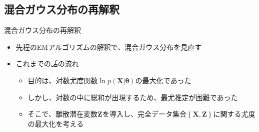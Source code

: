 \documentclass[dvipdfmx,notheorems,t]{beamer}
\begin{document}
\subsection{混合ガウス分布の再解釈}

\begin{frame}{混合ガウス分布の再解釈}

\begin{itemize}
	\item 先程のEMアルゴリズムの解釈で、混合ガウス分布を見直す
	\newline
	
	\item これまでの話の流れ
	\begin{itemize}
		\item 目的は、対数尤度関数$\ln p(\bm{X} | \bm{\theta})$の最大化であった
		\item しかし、対数の中に総和が出現するため、最尤推定が困難であった	
		\item そこで、離散潜在変数$\bm{Z}$を導入し、完全データ集合$\left\{ \bm{X}, \bm{Z} \right\}$に関する尤度の最大化を考える
	\end{itemize}
\end{itemize}

\end{frame}
\end{document}
